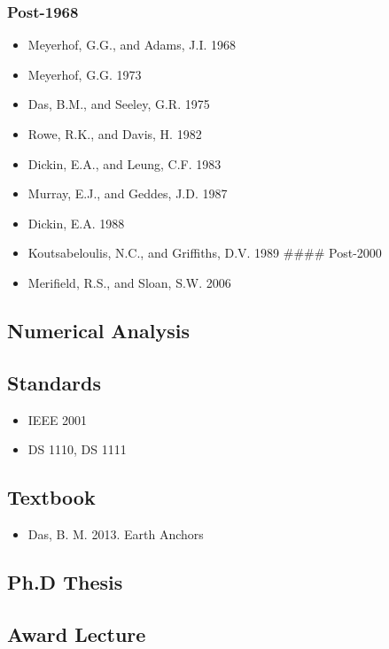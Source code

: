 \documentclass[a4paper, nobind]{templates/ociamthesis}
\providecommand{\tightlist}{%
  \setlength{\itemsep}{0pt}\setlength{\parskip}{0pt}}
\newcommand*{\bibtitle}{Works Cited}
\begin{document}
\hypertarget{post-1968}{%
\subsubsection{Post-1968}\label{post-1968}}

\begin{itemize}
\tightlist
\item
  Meyerhof, G.G., and Adams, J.I. 1968
\item
  Meyerhof, G.G. 1973
\item
  Das, B.M., and Seeley, G.R. 1975
\item
  Rowe, R.K., and Davis, H. 1982
\item
  Dickin, E.A., and Leung, C.F. 1983
\item
  Murray, E.J., and Geddes, J.D. 1987
\item
  Dickin, E.A. 1988
\item
  Koutsabeloulis, N.C., and Griffiths, D.V. 1989
  \#\#\#\# Post-2000
\item
  Merifield, R.S., and Sloan, S.W. 2006
\end{itemize}

\hypertarget{numerical-analysis}{%
\subsection{Numerical Analysis}\label{numerical-analysis}}

\hypertarget{standards}{%
\subsection{Standards}\label{standards}}

\begin{itemize}
\tightlist
\item
  IEEE 2001
\item
  DS 1110, DS 1111
\end{itemize}

\hypertarget{textbook}{%
\subsection{Textbook}\label{textbook}}

\begin{itemize}
\tightlist
\item
  Das, B. M. 2013. Earth Anchors
\end{itemize}

\hypertarget{ph.d-thesis}{%
\subsection{Ph.D Thesis}\label{ph.d-thesis}}

\hypertarget{award-lecture}{%
\subsection{Award Lecture}\label{award-lecture}}


\setlength{\baselineskip}{0pt} %

{\renewcommand*\MakeUppercase[1]{#1}%
\printbibliography[heading=bibintoc,title={\bibtitle}]}
\end{document}
